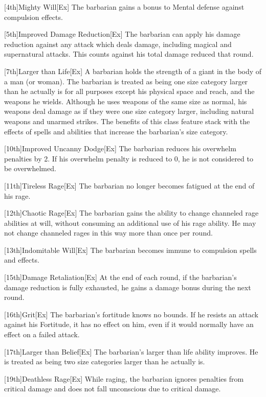 [4th]{Mighty Will}[Ex]
The barbarian gains a  bonus to Mental defense against compulsion effects.

[5th]{Improved Damage Reduction}[Ex]
The barbarian can apply his damage reduction against any attack which deals damage, including magical and supernatural attacks.
This counts against his total damage reduced that round.

[7th]{Larger than Life}[Ex]
A barbarian holds the strength of a giant in the body of a man (or woman).
The barbarian is treated as being one size category larger than he actually is for all purposes except his physical space and reach, and the weapons he wields.
Although he uses weapons of the same size as normal, his weapons deal damage as if they were one size category larger, including natural weapons and unarmed strikes.
The benefits of this class feature stack with the effects of spells and abilities that increase the barbarian's size category.

[10th]{Improved Uncanny Dodge}[Ex]
The barbarian reduces his overwhelm penalties by 2.
If his overwhelm penalty is reduced to 0, he is not considered to be overwhelmed.

[11th]{Tireless Rage}[Ex]
The barbarian no longer becomes fatigued at the end of his rage.

[12th]{Chaotic Rage}[Ex]
The barbarian gains the ability to change channeled rage abilities at will, without consuming an additional use of his rage ability.
He may not change channeled rages in this way more than once per round.

[13th]{Indomitable Will}[Ex]
The barbarian becomes immune to compulsion spells and effects.

[15th]{Damage Retaliation}[Ex]
At the end of each round, if the barbarian's damage reduction is fully exhausted, he gains a  damage bonus during the next round.

[16th]{Grit}[Ex]
The barbarian's fortitude knows no bounds.
If he resists an attack against his Fortitude, it has no effect on him, even if it would normally have an effect on a failed attack.

[17th]{Larger than Belief}[Ex]
The barbarian's larger than life ability improves.
He is treated as being two size categories larger than he actually is.

[19th]{Deathless Rage}[Ex]
While raging, the barbarian ignores penalties from critical damage and does not fall unconscious due to critical damage.

